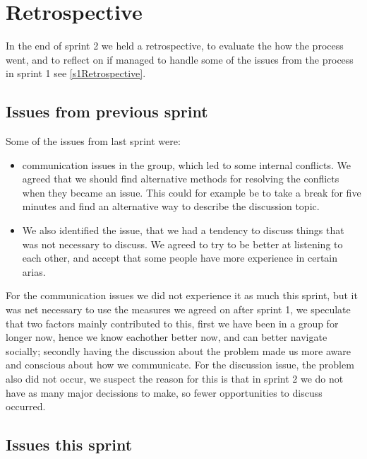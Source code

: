 \section{Retrospective} \label{s2Retrospective}

In the end of sprint 2 we held a retrospective, to evaluate the how the process went, and to reflect on if managed to handle some of the issues from the process in sprint 1 see \autoref{s1Retrospective}.

\subsection{Issues from previous sprint}

Some of the issues from last sprint were:
\begin{itemize}
    \item communication issues in the group, which led to some internal conflicts. We agreed that we should find alternative methods for resolving the conflicts when they became an issue. This could for example be to take a break for five minutes and find an alternative way to describe the discussion topic. 
    \item We also identified the issue, that we had a tendency to discuss things that was not necessary to discuss. We agreed to try to be better at listening to each other, and accept that some people have more experience in certain arias. 
\end{itemize}

For the communication issues we did not experience it as much this sprint, but it was net necessary to use the measures we agreed on after sprint 1, we speculate that two factors mainly contributed to this, first we have been in a group for longer now, hence we know eachother better now, and can better navigate socially; secondly having the discussion about the problem made us more aware and conscious about how we communicate.
For the discussion issue, the problem also did not occur, we suspect the reason for this is that in sprint 2 we do not have  as many major decissions to make, so fewer opportunities to discuss occurred.

\subsection{Issues this sprint}

